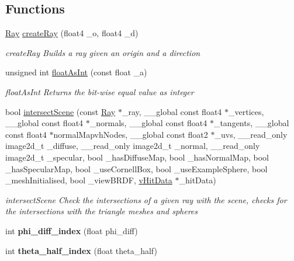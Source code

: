 \subsection*{Functions}
\begin{DoxyCompactItemize}
\item 
\hyperlink{structRay}{Ray} \hyperlink{PathTracer_8cl_a0f62dc685261380c888f930d3f04b813}{create\-Ray} (float4 \-\_\-o, float4 \-\_\-d)
\begin{DoxyCompactList}\small\item\em create\-Ray Builds a ray given an origin and a direction \end{DoxyCompactList}\item 
unsigned int \hyperlink{PathTracer_8cl_a96d1b38c698388294674aa643d3d26b2}{float\-As\-Int} (const float \-\_\-a)
\begin{DoxyCompactList}\small\item\em float\-As\-Int Returns the bit-\/wise equal value as integer \end{DoxyCompactList}\item 
bool \hyperlink{PathTracer_8cl_a329fb07255626c74d97267a19b2e6dce}{intersect\-Scene} (const \hyperlink{structRay}{Ray} $\ast$\-\_\-ray, \-\_\-\-\_\-global const float4 $\ast$\-\_\-vertices, \-\_\-\-\_\-global const float4 $\ast$\-\_\-normals, \-\_\-\-\_\-global const float4 $\ast$\-\_\-tangents, \-\_\-\-\_\-global const float4 $\ast$normal\-Mapvh\-Nodes, \-\_\-\-\_\-global const float2 $\ast$\-\_\-uvs, \-\_\-\-\_\-read\-\_\-only image2d\-\_\-t \-\_\-diffuse, \-\_\-\-\_\-read\-\_\-only image2d\-\_\-t \-\_\-normal, \-\_\-\-\_\-read\-\_\-only image2d\-\_\-t \-\_\-specular, bool \-\_\-has\-Diffuse\-Map, bool \-\_\-has\-Normal\-Map, bool \-\_\-has\-Specular\-Map, bool \-\_\-use\-Cornell\-Box, bool \-\_\-use\-Example\-Sphere, bool \-\_\-mesh\-Initialised, bool \-\_\-view\-B\-R\-D\-F, \hyperlink{structvHitData}{v\-Hit\-Data} $\ast$\-\_\-hit\-Data)
\begin{DoxyCompactList}\small\item\em intersect\-Scene Check the intersections of a given ray with the scene, checks for the intersections with the triangle meshes and spheres \end{DoxyCompactList}\item 
\hypertarget{PathTracer_8cl_a06667f67750cd42ea614e89817657f79}{int {\bfseries phi\-\_\-diff\-\_\-index} (float phi\-\_\-diff)}\label{PathTracer_8cl_a06667f67750cd42ea614e89817657f79}

\item 
\hypertarget{PathTracer_8cl_aee1dde35c1c9bb558ce06da59dd34b7e}{int {\bfseries theta\-\_\-half\-\_\-index} (float theta\-\_\-half)}\label{PathTracer_8cl_aee1dde35c1c9bb558ce06da59dd34b7e}


\end{DoxyCompactItemize}

